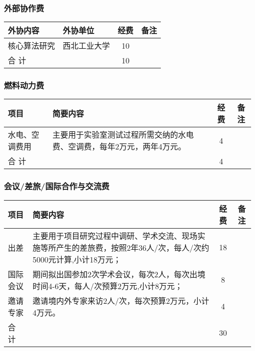 \subsubsection{外部协作费}
\begin{table}[H]
	\centering
	\begin{tabular}{m{3cm} m{7.5cm} cc}
		\toprule
		外协内容     & 外协单位     & 经费 & 备注 \\
		\midrule
		核心算法研究 & 西北工业大学 & 10   &      \\
		合 计        &              & 10       \\
		\bottomrule
	\end{tabular}
\end{table}

\subsubsection{燃料动力费}

\begin{table}[H]
	\centering
	\begin{tabular}{m{3cm} m{7.5cm} cc}
		\toprule
		项目     & 简要内容     & 经费 & 备注 \\
		\midrule
		水电、空调费用 & 主要用于实验室测试过程所需交纳的水电费、空调费，每年2万元，两年4万元。 & 4   &      \\
		合 计        &              & 4       \\
		\bottomrule
	\end{tabular}
\end{table}

\subsubsection{会议/差旅/国际合作与交流费}
\begin{table}[H]
	\centering
	\begin{tabular}{m{3cm} m{7.5cm} cc}
		\toprule
		项目     & 简要内容     & 经费 & 备注 \\
		\midrule
		出差 & 主要用于项目研究过程中调研、学术交流、现场实施等所产生的差旅费，按照2年36人/次，每人/次约5000元计算,小计18万元； & 18   &      \\
		国际会议 & 期间拟出国参加2次学术会议，每次2人，每次出境时间4-6天，每人/次预算2万元,小计8万元； & 8   &      \\
		邀请专家 & 邀请境内外专家来访2人/次，每次预算2万元，小计4万元。 & 4   &      \\
		合 计        &              & 30      \\
		\bottomrule
	\end{tabular}
\end{table}

